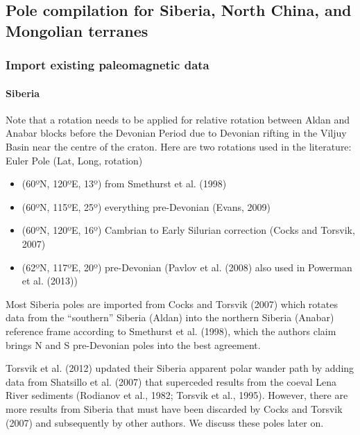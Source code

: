 \documentclass[11pt]{article}
\providecommand{\tightlist}{%
      \setlength{\itemsep}{0pt}\setlength{\parskip}{0pt}}
\begin{document}
    \subsection{Pole compilation for Siberia, North China, and Mongolian
terranes}\label{pole-compilation-for-siberia-north-china-and-mongolian-terranes}

    \subsubsection{Import existing paleomagnetic
data}\label{import-existing-paleomagnetic-data}

    \paragraph{Siberia}\label{siberia}

    Note that a rotation needs to be applied for relative rotation between
Aldan and Anabar blocks before the Devonian Period due to Devonian
rifting in the Viljuy Basin near the centre of the craton. Here are two
rotations used in the literature: Euler Pole (Lat, Long, rotation)

\begin{itemize}
\tightlist
\item
  (60ºN, 120ºE, 13º) from Smethurst et al. (1998)
\item
  (60ºN, 115ºE, 25º) everything pre-Devonian (Evans, 2009)
\item
  (60ºN, 120ºE, 16º) Cambrian to Early Silurian correction (Cocks and
  Torsvik, 2007)
\item
  (62ºN, 117ºE, 20º) pre-Devonian (Pavlov et al. (2008) also used in
  Powerman et al. (2013))
\end{itemize}

Most Siberia poles are imported from Cocks and Torsvik (2007) which
rotates data from the ``southern'' Siberia (Aldan) into the northern
Siberia (Anabar) reference frame according to Smethurst et al. (1998),
which the authors claim brings N and S pre-Devonian poles into the best
agreement.

    Torsvik et al. (2012) updated their Siberia apparent polar wander path
by adding data from Shatsillo et al. (2007) that superceded results from
the coeval Lena River sediments (Rodianov et al., 1982; Torsvik et al.,
1995). However, there are more results from Siberia that must have been
discarded by Cocks and Torsvik (2007) and subsequently by other authors.
We discuss these poles later on.
\end{document}
